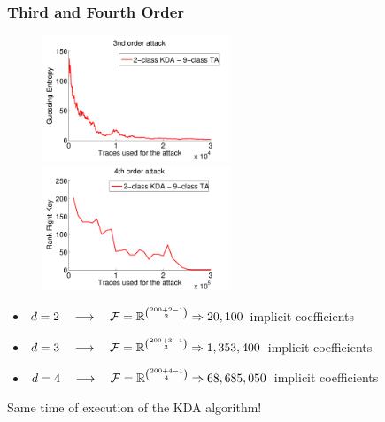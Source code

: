 \begin{frame}
\frametitle{Third and Fourth Order}
\begin{figure}
\includegraphics[width=0.5\textwidth]{figures/3order_only_9.pdf}
\includegraphics[width=0.5\textwidth]{figures/4order_only_9.pdf}
\end{figure}


\begin{itemize}
\item $d=2 \quad \longrightarrow \quad  \mathcal{F} = \mathbb{R}^{{200+2-1}\choose{2}} \Rightarrow 20,100$ implicit coefficients
\item $d=3 \quad \longrightarrow \quad  \mathcal{F} = \mathbb{R}^{{200+3-1}\choose{3}} \Rightarrow 1,353,400$ implicit coefficients
\item  $d=4 \quad \longrightarrow \quad  \mathcal{F} = \mathbb{R}^{{200+4-1}\choose{4}} \Rightarrow 68,685,050$ implicit coefficients
\end{itemize}

Same time of execution of the KDA algorithm!

\end{frame}

%
%


